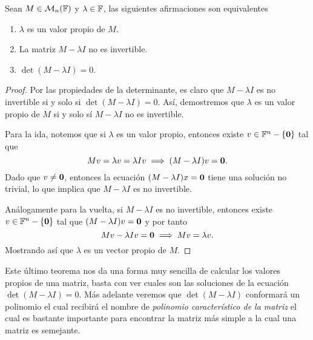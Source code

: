 \begin{teor}\label{teor:PropVP}
  Sean $M \in \mathcal{M}_n(\mathbb{F})$ y $\lambda \in \mathbb{F}$, las siguientes afirmaciones son equivalentes
  \begin{enumerate}
    \item $\lambda$ es un valor propio de $M$.
    \item La matriz $M-\lambda I$ no es invertible.
    \item $\det(M-\lambda I) = 0$.
  \end{enumerate}
\end{teor}
\begin{proof}
  Por las propiedades de la determinante, es claro que $M-\lambda I$ es no invertible si y solo si $\det(M-\lambda I)=0$. Así, demostremos que $\lambda$ es un valor propio de $M$ si y solo sí $M-\lambda I$ no es invertible.

  Para la ida, notemos que si $\lambda$ es un valor propio, entonces existe $v \in \mathbb{F}^n-\{\mathbf{0}\}$ tal que 
    \[ Mv=\lambda v = \lambda Iv \implies (M-\lambda I)v = \mathbf{0}. \]
  Dado que $v \neq \mathbf{0}$, entonces la ecuación $(M-\lambda I)x = \mathbf{0}$ tiene una solución no trivial, lo que implica que $M-\lambda I$ es no invertible.

  Análogamente para la vuelta, si $M-\lambda I$ es no invertible, entonces existe $v \in \mathbb{F}^n-\{\mathbf{0}\}$ tal que $(M-\lambda I)v = \mathbf{0}$ y por tanto
  \[ Mv - \lambda Iv = \mathbf{0} \implies Mv = \lambda v. \]
  Mostrando así que $\lambda$ es un vector propio de $M$.
\end{proof}

Este último teorema nos da una forma muy sencilla de calcular los valores propios de una matriz, basta con ver cuales son las soluciones de la ecuación $\det(M-\lambda I) = 0$. Más adelante veremos que $\det(M-\lambda I)$ conformará un polinomio el cual recibirá el nombre de \emph{polinomio característico de la matriz} el cual es bastante importante para encontrar la matriz más simple a la cual una matriz es semejante.

